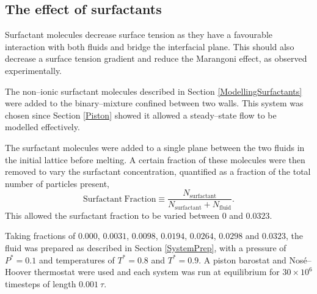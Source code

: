 \subsection{The effect of surfactants}\label{SurfResult}
Surfactant molecules decrease surface tension as they have a favourable interaction with both fluids and bridge the interfacial plane.
This should also decrease a surface tension gradient and reduce the Marangoni effect, as observed experimentally.\cite{KimSubramanianA,KimSubramanianB,BartonSubramanian,ChenStebe}

The non--ionic surfactant molecules described in Section \ref{ModellingSurfactants} were added to the binary--mixture confined between two walls.
This system was chosen since Section \ref{Piston} showed it allowed a steady--state flow to be modelled effectively.

The surfactant molecules were added to a single plane between the two fluids in the initial lattice before melting.
A certain fraction of these molecules were then removed to vary the surfactant concentration, quantified as a fraction of the total number of particles present,
\begin{equation}
\mathrm{Surfactant\ Fraction} \equiv \frac{N_{\mathrm{surfactant}}}{N_{\mathrm{surfactant}}+N_{\mathrm{fluid}}}.
\end{equation}
This allowed the surfactant fraction to be varied between $0$ and $0.0323$.

Taking fractions of $0.000$, $0.0031$, $0.0098$, $0.0194$, $0.0264$, $0.0298$ and $0.0323$, the fluid was prepared as described in Section \ref{SystemPrep}, with a pressure of $P^{*}=0.1$ and temperatures of $T^{*}=0.8$ and $T^{*}=0.9$.
A piston barostat and Nos\'{e}--Hoover thermostat were used and each system was run at equilibrium for $30 \times 10^{6}$ timesteps of length $0.001\ \tau$.

